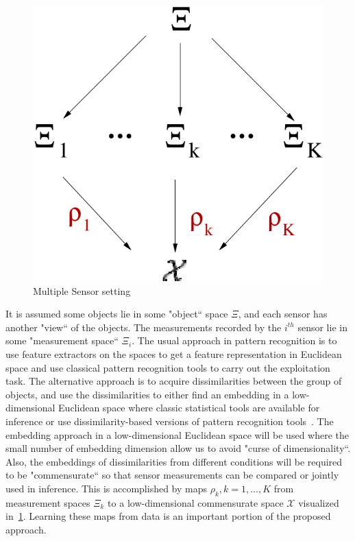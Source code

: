 \documentclass[11pt]{article} %
\begin{document}
\begin{figure}
\begin{center}
\includegraphics[scale=0.25]{gen-model-orig-proj.pdf}
\caption{Multiple Sensor setting}
\label{fig:fig1}
\end{center}
\end{figure}


It is assumed some objects lie in some "object`` space $\Xi$, and each sensor has another "view`` of the objects. The measurements recorded by the $i^{th}$ sensor lie in some "measurement space`` $\Xi_i$. The usual approach in pattern recognition is to use feature extractors on the spaces to get a feature representation in Euclidean space and use classical pattern recognition tools to carry out the exploitation task. The alternative approach is to acquire dissimilarities between the group of objects, and use the dissimilarities to either find an embedding in a low-dimensional Euclidean space where classic statistical tools are available for inference or use dissimilarity-based versions of pattern recognition tools~\cite{duin2005dissimilarity}. The embedding approach in a  low-dimensional Euclidean space will be used where the small number of embedding dimension allow us to avoid "curse of dimensionality``. Also, the embeddings of dissimilarities from  different conditions will be required to be "commensurate`` so that sensor measurements can be compared or jointly used in inference. This is accomplished by maps $\rho_k,k=1,\ldots,K$ from measurement spaces $\Xi_k$ to a low-dimensional commensurate space $\mathcal{X}$ visualized in~\ref{fig:fig1}. Learning these maps from data is  an important portion of the proposed  approach.
\end{document}
